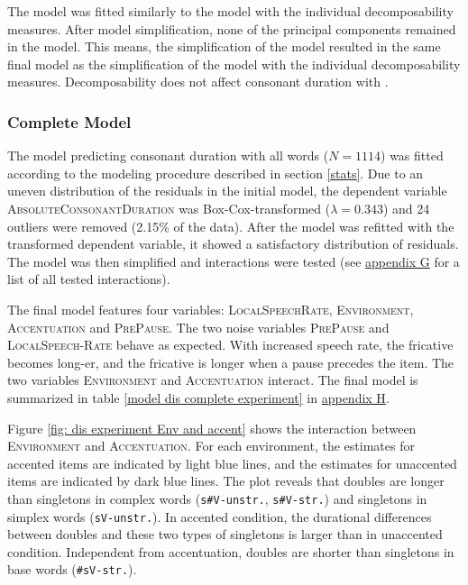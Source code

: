 The model was fitted similarly to the model with the individual decomposability measures. After model simplification, none of the principal components remained in the model. This means, the simplification of the model resulted in the same final model as the simplification of the model with the individual decomposability measures. Decomposability does not affect consonant duration with .


\subsubsection{Complete Model}

The model predicting consonant duration with all words ($N=1114$) was fitted according to the modeling procedure described in section \ref{stats}. Due to an uneven distribution of the residuals in the initial model, the dependent variable \textsc{AbsoluteConsonantDuration} was Box-Cox-transformed ($\lambda = 0.343$) and 24 outliers were removed (2.15\% of the data). After the model was refitted with the transformed dependent variable, it showed a satisfactory distribution of residuals.  The model was then simplified and interactions were tested (see \hyperref[Appendix G Summaries of tested interactions in experimental study]{appendix G} for a list of all tested interactions). 

The final model features four variables: \textsc{LocalSpeechRate}, \textsc{Environment}, \textsc{Accentuation} and \textsc{PrePause}. The two noise variables \textsc{PrePause} and \textsc{LocalSpeech-Rate} behave as expected. With increased speech rate, the fricative becomes long-er, and the fricative is longer when a pause precedes the item.
 The two variables \textsc{Environment} and \textsc{Accentuation} interact. The final model is summarized in table \ref{model dis complete experiment} in \hyperref[Appendix H: Model Summaries Experiment]{appendix H}.




Figure \ref{fig:  dis experiment Env and accent} shows the interaction between \textsc{Environment} and \textsc{Accentuation}. For each environment, the estimates for accented items are indicated by light blue lines, and the estimates for unaccented items are indicated by dark blue lines.
The plot reveals that doubles are longer than singletons in complex words (\texttt{s\#V-unstr.}, \texttt{s\#V-str.}) and singletons in simplex words (\texttt{sV-unstr.}). In accented condition, the durational differences between doubles and these two types of singletons is larger than in unaccented condition. 
Independent from accentuation, doubles are shorter than singletons in base words (\texttt{\#sV-str.}).


